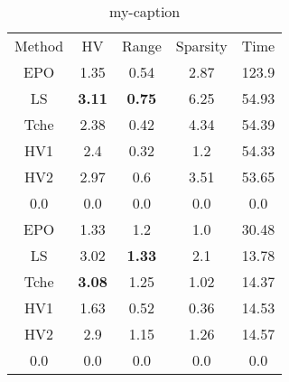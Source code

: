 \begin{table}[]
\centering
\caption{my-caption}
\label{my-label}
\begin{tabular}{ccccc}
Method&      HV           &             Range        &             Sparsity&        Time\\
EPO   &      1.35         &             0.54         &             2.87    &        123.9\\
LS    &      \textbf{3.11}&             \textbf{0.75}&             6.25    &        54.93\\
Tche  &      2.38         &             0.42         &             4.34    &        54.39\\
HV1   &      2.4          &             0.32         &             1.2     &        54.33\\
HV2   &      2.97         &             0.6          &             3.51    &        53.65\\
0.0   &      0.0          &             0.0          &             0.0     &        0.0\\
EPO   &      1.33         &             1.2          &             1.0     &        30.48\\
LS    &      3.02         &             \textbf{1.33}&             2.1     &        13.78\\
Tche  &      \textbf{3.08}&             1.25         &             1.02    &        14.37\\
HV1   &      1.63         &             0.52         &             0.36    &        14.53\\
HV2   &      2.9          &             1.15         &             1.26    &        14.57\\
0.0   &      0.0          &             0.0          &             0.0     &        0.0\\

\end{tabular}
\end{table}

